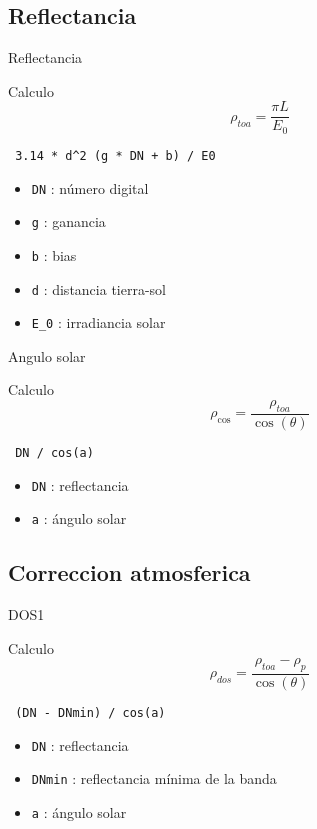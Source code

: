 \documentclass[]{beamer}
\begin{document}
\subsection{Reflectancia}

\begin{frame}[fragile]{Reflectancia}
  \begin{block}{Calculo}
    $$ \rho_{toa} = \frac{\pi L}{E_0}$$ \pause
    \begin{center}
    \verb| 3.14 * d^2 (g * DN + b) / E0 | \pause
    \end{center}
    \begin{itemize}
      \item \verb+DN+ : número digital
      \item \verb+g+ : ganancia
      \item \verb+b+ : bias
      \item \verb+d+ : distancia tierra-sol
      \item \verb+E_0+ : irradiancia solar
    \end{itemize}
  \end{block}
\end{frame}

\begin{frame}[fragile]{Angulo solar}
  \begin{block}{Calculo}
    $$ \rho_{\cos} = \frac{\rho_{toa}}{\cos(\theta)}$$ \pause
    \begin{center}
    \verb| DN / cos(a)  | \pause
    \end{center}
    \begin{itemize}
      \item \verb+DN+ : reflectancia
      \item \verb+a+ : ángulo solar
    \end{itemize}
  \end{block}
\end{frame}

\subsection{Correccion atmosferica}

\begin{frame}[fragile]{DOS1}
  \begin{block}{Calculo}
    $$ \rho_{dos} = \frac{\rho_{toa} - \rho_p}{\cos(\theta)}$$ \pause
    \begin{center}
    \verb| (DN - DNmin) / cos(a)  | \pause
    \end{center}
    \begin{itemize}
      \item \verb+DN+ : reflectancia
      \item \verb+DNmin+ : reflectancia m\'inima de la banda
      \item \verb+a+ : ángulo solar
    \end{itemize}
  \end{block}
\end{frame}
\end{document}
